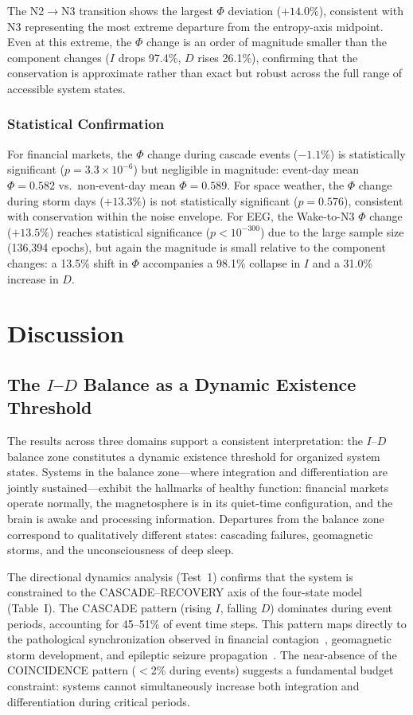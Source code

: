 \documentclass[aip,cha,reprint,amsmath,amssymb,final,floatfix]{revtex4-2}
\begin{document}
The N2$\to$N3 transition shows the largest $\Phi$ deviation ($+14.0\%$), consistent with N3 representing the most extreme departure from the entropy-axis midpoint. Even at this extreme, the $\Phi$ change is an order of magnitude smaller than the component changes ($I$ drops 97.4\%, $D$ rises 26.1\%), confirming that the conservation is approximate rather than exact but robust across the full range of accessible system states.

\subsubsection{Statistical Confirmation}

For financial markets, the $\Phi$ change during cascade events ($-1.1\%$) is statistically significant ($p = 3.3 \times 10^{-6}$) but negligible in magnitude: event-day mean $\Phi = 0.582$ vs.\ non-event-day mean $\Phi = 0.589$. For space weather, the $\Phi$ change during storm days ($+13.3\%$) is not statistically significant ($p = 0.576$), consistent with conservation within the noise envelope. For EEG, the Wake-to-N3 $\Phi$ change ($+13.5\%$) reaches statistical significance ($p < 10^{-300}$) due to the large sample size (136,394 epochs), but again the magnitude is small relative to the component changes: a 13.5\% shift in $\Phi$ accompanies a 98.1\% collapse in $I$ and a 31.0\% increase in $D$.


\section{Discussion}

\subsection{The $I$--$D$ Balance as a Dynamic Existence Threshold}

The results across three domains support a consistent interpretation: the $I$--$D$ balance zone constitutes a dynamic existence threshold for organized system states. Systems in the balance zone---where integration and differentiation are jointly sustained---exhibit the hallmarks of healthy function: financial markets operate normally, the magnetosphere is in its quiet-time configuration, and the brain is awake and processing information. Departures from the balance zone correspond to qualitatively different states: cascading failures, geomagnetic storms, and the unconsciousness of deep sleep.

The directional dynamics analysis (Test~1) confirms that the system is constrained to the CASCADE--RECOVERY axis of the four-state model (Table~I). The CASCADE pattern (rising $I$, falling $D$) dominates during event periods, accounting for 45--51\% of event time steps. This pattern maps directly to the pathological synchronization observed in financial contagion~\cite{forbes2002}, geomagnetic storm development, and epileptic seizure propagation~\cite{lehnertz2009}. The near-absence of the COINCIDENCE pattern ($<$2\% during events) suggests a fundamental budget constraint: systems cannot simultaneously increase both integration and differentiation during critical periods.
\end{document}
